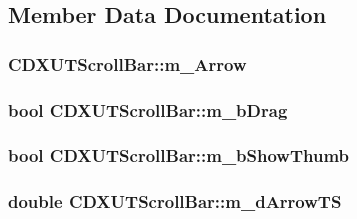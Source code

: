\subsection{Member Data Documentation}
\hypertarget{class_c_d_x_u_t_scroll_bar_a909a6087207d8187daacf84356fefbe8}{
\subsubsection[{m\_\-Arrow}]{ {\bf CDXUTScrollBar::m\_\-Arrow}}}
\label{class_c_d_x_u_t_scroll_bar_a909a6087207d8187daacf84356fefbe8}
\hypertarget{class_c_d_x_u_t_scroll_bar_a01ff830ad7a6126be8fe58c7d6c5a625}{
\subsubsection[{m\_\-bDrag}]{\setlength{\rightskip}{0pt plus 5cm}bool {\bf CDXUTScrollBar::m\_\-bDrag}}}
\label{class_c_d_x_u_t_scroll_bar_a01ff830ad7a6126be8fe58c7d6c5a625}
\hypertarget{class_c_d_x_u_t_scroll_bar_aa7a51e9a1a97f52f0c0867de95f2a348}{
\subsubsection[{m\_\-bShowThumb}]{\setlength{\rightskip}{0pt plus 5cm}bool {\bf CDXUTScrollBar::m\_\-bShowThumb}}}
\label{class_c_d_x_u_t_scroll_bar_aa7a51e9a1a97f52f0c0867de95f2a348}
\hypertarget{class_c_d_x_u_t_scroll_bar_a0e16cf4d357346864321f471afa456cd}{
\subsubsection[{m\_\-dArrowTS}]{\setlength{\rightskip}{0pt plus 5cm}double {\bf CDXUTScrollBar::m\_\-dArrowTS}}}
